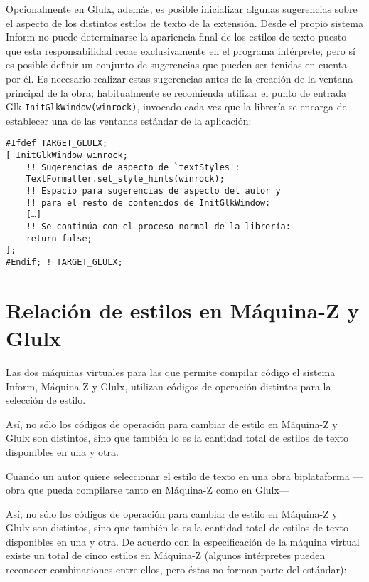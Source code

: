 \documentclass[a4paper,12pt]{article}
\numberwithin{equation}{section}
\begin{document}
Opcionalmente en Glulx, además, es posible inicializar algunas sugerencias sobre el aspecto de los distintos estilos de texto de la extensión. Desde el propio sistema Inform no puede determinarse la apariencia final de los estilos de texto puesto que esta responsabilidad recae exclusivamente en el programa intérprete, pero sí es posible definir un conjunto de sugerencias que pueden ser tenidas en cuenta por él. Es necesario realizar estas sugerencias antes de la creación de la ventana principal de la obra; habitualmente se recomienda utilizar el punto de entrada Glk \verb|InitGlkWindow(winrock)|, invocado cada vez que la librería se encarga de establecer una de las ventanas estándar de la aplicación\cite{PLO02}:

\begin{verbatim}
#Ifdef TARGET_GLULX;
[ InitGlkWindow winrock;
    !! Sugerencias de aspecto de `textStyles':
    TextFormatter.set_style_hints(winrock);
    !! Espacio para sugerencias de aspecto del autor y
    !! para el resto de contenidos de InitGlkWindow:
    […]
    !! Se continúa con el proceso normal de la librería:
    return false;
];
#Endif; ! TARGET_GLULX;
\end{verbatim}


\section{Relación de estilos en Máquina-Z y Glulx}

Las dos máquinas virtuales para las que permite compilar código el sistema Inform, Máquina-Z y Glulx, utilizan códigos de operación distintos para la selección de estilo.

Así, no sólo los códigos de operación para cambiar de estilo en Máquina-Z y Glulx son distintos, sino que también lo es la cantidad total de estilos de texto disponibles en una y otra.

Cuando un autor quiere seleccionar el estilo de texto en una obra biplataforma ---obra que pueda compilarse tanto en Máquina-Z como en Glulx---





 Así, no sólo los códigos de operación para cambiar de estilo en Máquina-Z y Glulx son distintos, sino que también lo es la cantidad total de estilos de texto disponibles en una y otra. De acuerdo con la especificación de la máquina virtual existe un total de cinco estilos en Máquina-Z\cite{NF14} (algunos intérpretes pueden reconocer combinaciones entre ellos, pero éstas no forman parte del estándar):
\end{document}
